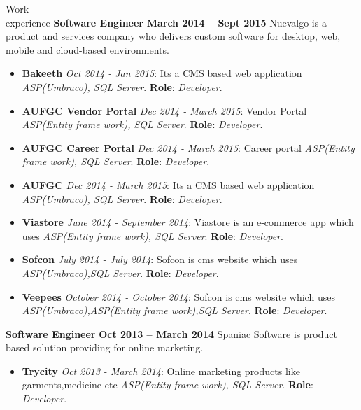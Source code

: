 \documentclass{resume}
\begin{document}
\begin{category}{Work \\experience}
  \citemnobullet \textbf{Software Engineer} \hfill \textbf{March 2014 -- Sept 2015}
  \citemnobullet Nuevalgo is a product and services company who delivers custom software for desktop, web, mobile and cloud-based environments.
  \begin{itemize}
  \item \textbf{Bakeeth} {\em Oct 2014 - Jan 2015}: Its a CMS based web application {\em ASP(Umbraco),  SQL Server}. \textbf{Role}: {\em Developer}.  
  \item \textbf{AUFGC Vendor Portal} {\em Dec 2014 - March 2015}: Vendor Portal {\em ASP(Entity frame work),  SQL Server}. \textbf{Role}: {\em Developer}.  
  \item \textbf{AUFGC Career Portal} {\em Dec 2014 - March 2015}: Career portal {\em ASP(Entity frame work),  SQL Server}. \textbf{Role}: {\em Developer}.  
  \item \textbf{AUFGC} {\em Dec 2014 - March 2015}: Its a CMS based web application {\em ASP(Umbraco),  SQL Server}. \textbf{Role}: {\em Developer}.  
  \item \textbf{Viastore} {\em June 2014 - September 2014}: Viastore is an e-commerce app which uses {\em ASP(Entity frame work),  SQL Server}. \textbf{Role}: {\em Developer}.  
  \item \textbf{Sofcon} {\em July 2014 - July 2014}: Sofcon is cms website which uses {\em ASP(Umbraco),SQL Server}. \textbf{Role}: {\em Developer}.
  \item \textbf{Veepees} {\em October 2014 - October 2014}: Sofcon is cms website which uses {\em ASP(Umbraco),ASP(Entity frame work),SQL Server}. \textbf{Role}: {\em Developer}.
  \end{itemize}
  
  \citemnobullet \textbf{Software Engineer} \hfill \textbf{Oct 2013 -- March 2014 }
  \citemnobullet Spaniac Software is product based solution providing for online marketing. 
\begin{itemize}
  \item \textbf{Trycity} {\em Oct 2013 - March 2014}:  Online marketing products like garments,medicine etc {\em ASP(Entity frame work),  SQL Server}. \textbf{Role}: {\em Developer}.
    \end{itemize}
  \end{category}

\end{document}
